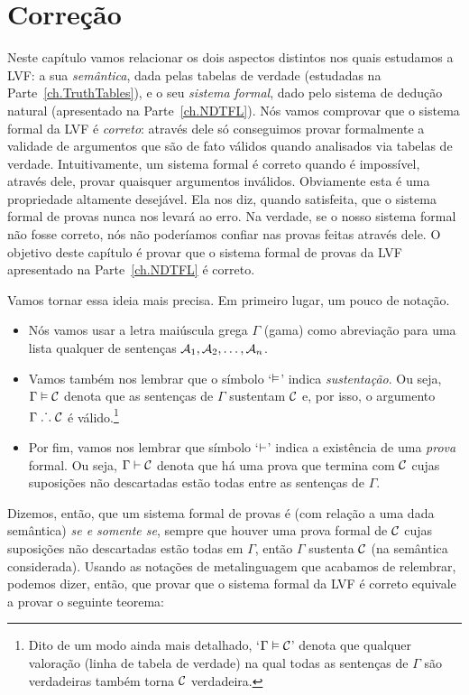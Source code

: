 \chapter{Correção}\label{ch:Soundness}

Neste capítulo vamos relacionar os dois aspectos distintos nos quais estudamos a LVF: a sua \textit{semântica}, dada pelas tabelas de verdade (estudadas  na Parte~\ref{ch.TruthTables}), e o seu \emph{sistema formal}, dado pelo sistema de dedução natural (apresentado na Parte~\ref {ch.NDTFL}).
Nós vamos comprovar que o sistema formal da LVF é \textit{correto}: através dele só conseguimos provar formalmente a validade de argumentos que são de fato válidos quando analisados via tabelas de verdade.
Intuitivamente, um sistema formal é correto quando é impossível, através dele, provar quaisquer argumentos inválidos.
Obviamente esta é uma propriedade altamente desejável.
Ela nos diz, quando satisfeita, que o sistema formal de provas nunca nos levará ao erro.
Na verdade, se o nosso sistema formal não fosse correto, nós não poderíamos confiar nas provas feitas através dele.
O objetivo deste capítulo é provar que o sistema formal de provas da LVF apresentado na Parte~\ref {ch.NDTFL} é correto.

Vamos tornar essa ideia mais precisa.
Em primeiro lugar, um pouco de notação.
\begin{itemize}
	\item Nós vamos usar a letra maiúscula grega $\Gamma$ (gama) como abreviação para uma lista qualquer de sentenças $\mathcal{A}_1, \mathcal{A}_2, \ldots, \mathcal{A}_n$.
	\item Vamos também nos lembrar que o símbolo `$\vDash$' indica \textit{sustentação}. Ou seja, $\Gamma \vDash \mathcal{C}$ denota que as sentenças de $\Gamma$ sustentam $\mathcal{C}$ e, por isso, o argumento $\Gamma \mathrel{\ldotp\dot{}\,\ldotp} \mathcal{C}$ é válido.\footnote{
		Dito de um modo ainda mais detalhado, `$\Gamma \vDash \mathcal{C}$' denota que qualquer valoração (linha de tabela de verdade) na qual todas as sentenças de $\Gamma$ são verdadeiras também torna $\mathcal{C}$ verdadeira.}
	\item Por fim, vamos nos lembrar que símbolo `$\vdash$' indica a existência de uma \textit{prova} formal. Ou seja, $\Gamma \vdash \mathcal{C}$ denota que há uma prova que termina com $\mathcal{C}$ cujas suposições não descartadas estão todas entre as sentenças de $\Gamma$.	
\end{itemize}
Dizemos, então, que um sistema formal de provas é  (com relação a uma dada semântica) \emph{se e somente se}, sempre que houver uma prova formal de $\mathcal{C}$ cujas suposições não descartadas estão todas em $\Gamma$, então $\Gamma$ sustenta $\mathcal{C}$ (na semântica considerada). 
Usando as notações de metalinguagem que acabamos de relembrar, podemos dizer, então, que provar que o sistema formal da LVF é correto equivale a provar o seguinte teorema:

